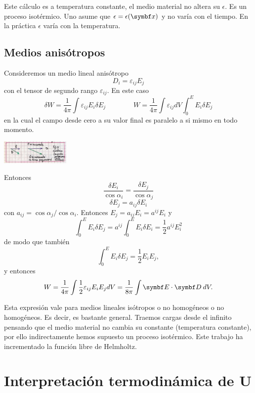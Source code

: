 \documentclass[10pt,oneside]{CBFT_book}
\begin{document}
Este cálculo es a temperatura constante, el medio material no altera su $\epsilon$.
Es un proceso isotérmico. Uno asume que $\epsilon=\epsilon(\vb{x})$ y no varía con el tiempo.
En la práctica $\epsilon$ varía con la temperatura.

\subsection{Medios anisótropos}

Consideremos un medio lineal anisótropo
\[
	D_i = \varepsilon_{ij} E_j
\]
con el tensor de segundo rango $\varepsilon_{ij}$. En este caso
\[
	\delta W = \frac{1}{4\pi} \int  \varepsilon_{ij} E_i \delta E_j \qquad \qquad
	W =  \frac{1}{4\pi} \int \varepsilon_{ij} dV \int_0^E E_i \delta E_j
\]
en la cual el campo  desde cero a su valor final es paralelo a si mismo en todo
momento.

\includegraphics[width=0.25\textwidth]{images/fig_ft1_mediolinealanisotropo.jpg}

Entonces
\[
	\frac{\delta E_i}{\cos\alpha_i} = \frac{\delta E_j}{\cos\alpha_j}
\]
\[
	\delta E_j = a_{ij} \delta E_i 
\]
con $a_{ij} = \cos\alpha_j / \cos\alpha_i$. Entonces $E_j = a_{ij} E_i = a^{ij} E_i$ y 
\[
	 \int_0^E E_i \delta E_j =  a^{ij} \int_0^E E_i \delta E_i = \frac{1}{2}  a^{ij} E_i^2
\]
de modo que también
\[
	\int_0^E E_i \delta E_j = \frac{1}{2} E_i E_j,
\]
y entonces
\[
	W = \frac{1}{4\pi} \int \frac{1}{2} \varepsilon_{ij} E_i E_j  dV =
	\frac{1}{8\pi} \int \pe{E}{D} \: dV.
\]

Esta expresión vale para medios lineales isótropos o no homogéneos o no homogéneos.
Es decir, es bastante general.
Traemos cargas desde el infinito pensando que el medio material no cambia su constante
(temperatura constante), por ello indirectamente hemos supuesto un proceso isotérmico.
Este trabajo ha incrementado la función libre de Helmholtz.

\section{Interpretación termodinámica de U}
\end{document}
